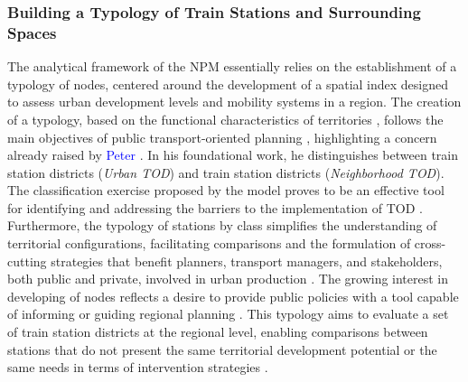 \begin{refsegment}
\subsubsection*{Building a Typology of Train Stations and Surrounding Spaces
    \label{chap6:litterature-concept-typologie}
    }

The analytical framework of the \acrshort{NPM} essentially relies on the establishment of a typology of nodes, centered around the development of a spatial index designed to assess urban development levels and mobility systems in a region. The creation of a typology, based on the functional characteristics of territories \textcolor{blue}{\autocite[2]{amini_pishro_node_2022}}, follows the main objectives of public transport-oriented planning \textcolor{blue}{\autocite[1]{motieyan_development_2018}}, highlighting a concern already raised by \textcolor{blue}{Peter} \textcolor{blue}{\textcite[57]{calthorpe_next_1993}}. In his foundational work, he distinguishes between  train station districts (\textsl{Urban TOD}) and  train station districts (\textsl{Neighborhood TOD}). The classification exercise proposed by the model proves to be an effective tool for identifying and addressing the barriers to the implementation of \acrshort{TOD} \textcolor{blue}{\autocite[55]{kamruzzaman_advance_2014}}. Furthermore, the typology of stations by class simplifies the understanding of territorial configurations, facilitating comparisons and the formulation of cross-cutting strategies that benefit planners, transport managers, and stakeholders, both public and private, involved in urban production \textcolor{blue}{\autocite[55]{kamruzzaman_advance_2014}}. The growing interest in developing  of nodes reflects a desire to provide public policies with a tool capable of informing or guiding regional planning \textcolor{blue}{\autocite[307]{higgins_forty_2016}}. This typology aims to evaluate a set of train station districts at the regional level, enabling comparisons between stations that do not present the same territorial development potential or the same needs in terms of intervention strategies \textcolor{blue}{\autocite[2]{iau_articulation_2017}}.%


\end{refsegment}
